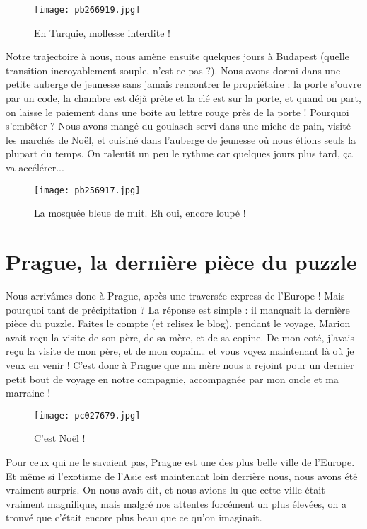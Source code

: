 \documentclass{book}
\begin{document}
\begin{figure}[h]
\centering
\texttt{[image: pb266919.jpg]}
\caption*{En Turquie, mollesse interdite !}
\end{figure}

Notre trajectoire à nous, nous amène ensuite quelques jours à Budapest (quelle transition incroyablement souple, n'est-ce pas ?). Nous avons dormi dans une petite auberge de jeunesse sans jamais rencontrer le propriétaire : la porte s'ouvre par un code, la chambre est déjà prête et la clé est sur la porte, et quand on part, on laisse le paiement dans une boite au lettre rouge près de la porte ! Pourquoi s'embêter ? Nous avons mangé du goulasch servi dans une miche de pain, visité les marchés de Noël, et cuisiné dans l'auberge de jeunesse où nous étions seuls la plupart du temps. On ralentit un peu le rythme car quelques jours plus tard, ça va accélérer...


\begin{figure}[h]
\centering
\texttt{[image: pb256917.jpg]}
\caption*{La mosquée bleue de nuit. Eh oui, encore loupé !}
\end{figure}





\chapter{Prague, la dernière pièce du puzzle}
Nous arrivâmes donc à Prague, après une traversée express de l'Europe ! Mais pourquoi tant de précipitation ? La réponse est simple : il manquait la dernière pièce du puzzle. Faites le compte (et relisez le blog), pendant le voyage, Marion avait reçu la visite de son père, de sa mère, et de sa copine. De mon coté, j’avais reçu la visite de mon père, et de mon copain… et vous voyez maintenant là où je veux en venir ! C'est donc à Prague que ma mère nous a rejoint pour un dernier petit bout de voyage en notre compagnie, accompagnée par mon oncle et ma marraine !


\begin{figure}[h]
\centering
\texttt{[image: pc027679.jpg]}
\caption*{C'est Noël !}
\end{figure}

Pour ceux qui ne le savaient pas, Prague est une des plus belle ville de l'Europe. Et même si l'exotisme de l'Asie est maintenant loin derrière nous, nous avons été vraiment surpris. On nous avait dit, et nous avions lu que cette ville était vraiment magnifique, mais malgré nos attentes forcément un plus élevées, on a trouvé que c'était encore plus beau que ce qu'on imaginait.
\end{document}
